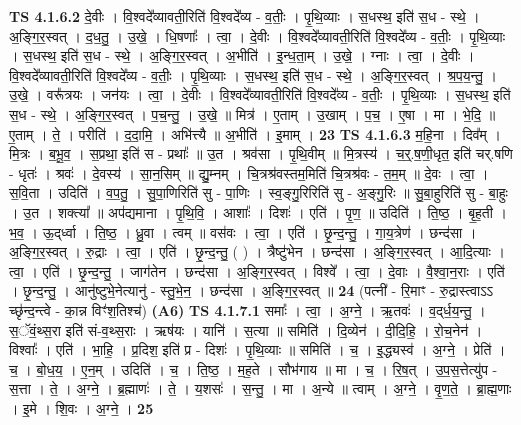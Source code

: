 \documentclass[17pt]{extarticle}
\begin{document}
                  \newline
                                \textbf{ TS 4.1.6.2} \newline
                  दे॒वीः । वि॒श्वदे᳚व्यावती॒रिति॑ वि॒श्वदे᳚व्य - व॒तीः॒ । पृ॒थि॒व्याः । स॒धस्थ॒ इति॑ स॒ध - स्थे॒ । अ॒ङ्गि॒र॒स्वत् । द॒ध॒तु॒ । उ॒खे॒ । धि॒षणाः᳚ । त्वा॒ । दे॒वीः । वि॒श्वदे᳚व्यावती॒रिति॑ वि॒श्वदे᳚व्य - व॒तीः॒ । पृ॒थि॒व्याः । स॒धस्थ॒ इति॑ स॒ध - स्थे॒ । अ॒ङ्गि॒र॒स्वत् । अ॒भीति॑ । इ॒न्ध॒ता॒म् । उ॒खे॒ । ग्नाः । त्वा॒ । दे॒वीः । वि॒श्वदे᳚व्यावती॒रिति॑ वि॒श्वदे᳚व्य - व॒तीः॒ । पृ॒थि॒व्याः । स॒धस्थ॒ इति॑ स॒ध - स्थे॒ । अ॒ङ्गि॒र॒स्वत् । श्र॒प॒य॒न्तु॒ । उ॒खे॒ । वरू᳚त्रयः । जन॑यः । त्वा॒ । दे॒वीः । वि॒श्वदे᳚व्यावती॒रिति॑ वि॒श्वदे᳚व्य - व॒तीः॒ । पृ॒थि॒व्याः । स॒धस्थ॒ इति॑ स॒ध - स्थे॒ । अ॒ङ्गि॒र॒स्वत् । प॒च॒न्तु॒ । उ॒खे॒ ॥ मित्र॑ । ए॒ताम् । उ॒खाम् । प॒च॒ । ए॒षा । मा । भे॒दि॒ ॥ ए॒ताम् । ते॒ । परीति॑ । द॒दा॒मि॒ । अभि॑त्त्यै ॥ अ॒भीति॑ । इ॒माम् । \textbf{  23} \newline
                  \newline
                                \textbf{ TS 4.1.6.3} \newline
                  म॒हि॒ना । दिव᳚म् । मि॒त्रः । ब॒भू॒व॒ । स॒प्रथा॒ इति॑ स - प्रथाः᳚ ॥ उ॒त । श्रव॑सा । पृ॒थि॒वीम् ॥ मि॒त्रस्य॑ । च॒र्॒.ष॒णी॒धृत॒ इति॑ चर्.षणि - धृतः॑ । श्रवः॑ । दे॒वस्य॑ । सा॒न॒सिम् ॥ द्यु॒म्नम् । चि॒त्रश्र॑वस्तम॒मिति॑ चि॒त्रश्र॑वः - त॒म॒म् ॥ दे॒वः । त्वा॒ । स॒वि॒ता । उदिति॑ । व॒प॒तु॒ । सु॒पा॒णिरिति॑ सु - पा॒णिः । स्व॒ङ्गु॒रिरिति॑ सु - अ॒ङ्गु॒रिः ॥ सु॒बा॒हुरिति॑ सु - बा॒हुः । उ॒त । शक्त्या᳚ ॥ अप॑द्यमाना । पृ॒थि॒वि॒ । आशाः᳚ । दिशः॑ । एति॑ । पृ॒ण॒ ॥ उदिति॑ । ति॒ष्ठ॒ । बृ॒ह॒ती । भ॒व॒ । ऊ॒द्‌र्ध्वा । ति॒ष्ठ॒ । ध्रु॒वा । त्वम् ॥ वस॑वः । त्वा॒ । एति॑ । छृ॒न्द॒न्तु॒ । गा॒य॒त्रेण॑ । छन्द॑सा । अ॒ङ्गि॒र॒स्वत् । रु॒द्राः । त्वा॒ । एति॑ । छृ॒न्द॒न्तु॒ ( ) । त्रैष्टु॑भेन । छन्द॑सा । अ॒ङ्गि॒र॒स्वत् । आ॒दि॒त्याः । त्वा॒ । एति॑ । छृ॒न्द॒न्तु॒ । जाग॑तेन । छन्द॑सा । अ॒ङ्गि॒र॒स्वत् । विश्वे᳚ । त्वा॒ । दे॒वाः । वै॒श्वा॒न॒राः । एति॑ । छृ॒न्द॒न्तु॒ । आनु॑ष्टुभे॒नेत्यानु॑ - स्तु॒भे॒न॒ । छन्द॑सा । अ॒ङ्गि॒र॒स्वत् ॥ \textbf{  24} \newline
                  \newline
                      (पत्नी॑ - रि॒माꣳ - रु॒द्रास्त्वाऽऽ च्छृ॑न्द॒न्त्वे - का॒न्न विꣳ॑श॒तिश्च॑)  \textbf{(A6)} \newline \newline
                                \textbf{ TS 4.1.7.1} \newline
                  समाः᳚ । त्वा॒ । अ॒ग्ने॒ । ऋ॒तवः॑ । व॒द्‌र्ध॒य॒न्तु॒ । स॒ॅवं॒थ्स॒रा इति॑ सं-व॒थ्स॒राः । ऋष॑यः । यानि॑ । स॒त्या ॥ समिति॑ । दि॒व्येन॑ । दी॒दि॒हि॒ । रो॒च॒नेन॑ । विश्वाः᳚ । एति॑ । भा॒हि॒ । प्र॒दिश॒ इति॑ प्र - दिशः॑ । पृ॒थि॒व्याः ॥ समिति॑ । च॒ । इ॒द्ध्यस्व॑ । अ॒ग्ने॒ । प्रेति॑ । च॒ । बो॒ध॒य॒ । ए॒न॒म् । उदिति॑ । च॒ । ति॒ष्ठ॒ । म॒ह॒ते । सौभ॑गाय ॥ मा । च॒ । रि॒ष॒त् । उ॒प॒स॒त्तेत्यु॑प - स॒त्ता । ते॒ । अ॒ग्ने॒ । ब्र॒ह्माणः॑ । ते॒ । य॒शसः॑ । स॒न्तु॒ । मा । अ॒न्ये ॥ त्वाम् । अ॒ग्ने॒ । वृ॒ण॒ते॒ । ब्रा॒ह्म॒णाः । इ॒मे । शि॒वः । अ॒ग्ने॒ । \textbf{  25} \newline
\end{document}
